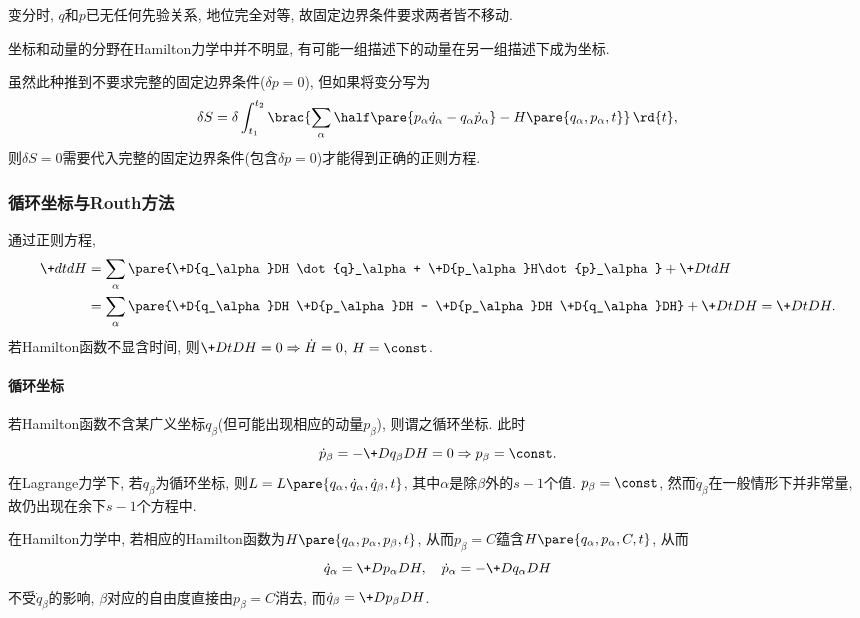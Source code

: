 \documentclass{ctexart}
\begin{document}
\begin{remark}
    变分时, $q$和$p$已无任何先验关系, 地位完全对等, 故固定边界条件要求两者皆不移动.
\end{remark}
\begin{remark}
    坐标和动量的分野在Hamilton力学中并不明显, 有可能一组描述下的动量在另一组描述下成为坐标.
\end{remark}
\begin{remark}
    虽然此种推到不要求完整的固定边界条件($\delta p = 0$), 但如果将变分写为
    \[ \delta S = \delta \int_{t_1}^{t_2} \brac{\sum_\alpha \half \pare{p_\alpha\dot{q}_\alpha - q_\alpha\dot{p}_\alpha} - H\pare{q_\alpha,p_\alpha,t}}\,\rd{t}, \]
    则$\delta S = 0$需要代入完整的固定边界条件(包含$\delta p = 0$)才能得到正确的正则方程.
\end{remark}


\subsubsection{循环坐标与Routh方法} %
\label{ssub:循环坐标与routh方法}

通过正则方程,
\begin{align*}
    \+dtdH &= \sum_\alpha\pare{\+D{q_\alpha}DH \dot{q}_\alpha + \+D{p_\alpha}H\dot{p}_\alpha} + \+DtdH \\
    &= \sum_\alpha \pare{\+D{q_\alpha}DH \+D{p_\alpha}DH - \+D{p_\alpha}DH \+D{q_\alpha}DH} + \+DtDH = \+DtDH.
\end{align*}
若Hamilton函数不显含时间, 则$\displaystyle \+DtDH = 0\Rightarrow \dot{H} = 0$, $H=\const$.

\paragraph{循环坐标} %
\label{par:循环坐标}

若Hamilton函数不含某广义坐标$q_\beta$(但可能出现相应的动量$p_\beta$), 则谓之循环坐标. 此时
\[ \dot{p}_\beta = -\+D{q_\beta}DH = 0\Rightarrow p_\beta = \const. \]
在Lagrange力学下, 若$q_\beta$为循环坐标, 则$L = L\pare{q_\alpha,\dot{q}_\alpha,\dot{q}_\beta,t}$, 其中$\alpha$是除$\beta$外的$s-1$个值. $p_\beta = \const$, 然而$\dot{q}_\beta$在一般情形下并非常量, 故仍出现在余下$s-1$个方程中.
\par
在Hamilton力学中, 若相应的Hamilton函数为$H\pare{q_\alpha,p_\alpha,p_\beta,t}$, 从而$p_\beta = C$蕴含$H\pare{q_\alpha,p_\alpha,C,t}$, 从而
\[ \dot{q}_\alpha = \+D{p_\alpha}DH,\quad \dot{p}_\alpha = -\+D{q_\alpha}DH \]
不受$\dot{q}_\beta$的影响, $\beta$对应的自由度直接由$p_\beta = C$消去, 而$\displaystyle \dot{q}_\beta = \+D{p_\beta}DH$.
\end{document}
